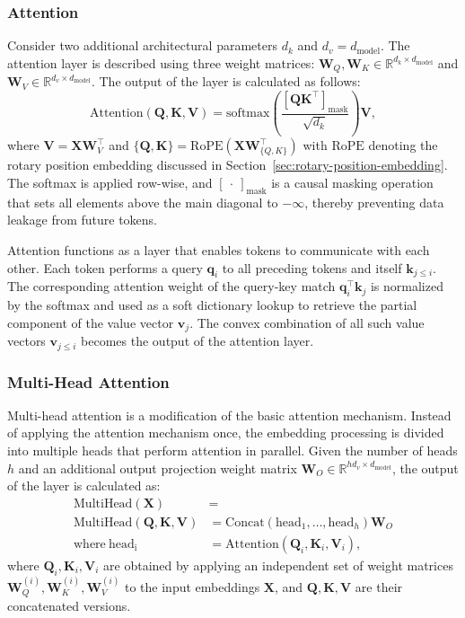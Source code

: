 \subsubsection*{Attention}

Consider two additional architectural parameters \(d_k\) and \(d_v = d_{\mathrm{model}}\). The attention layer is described using three weight matrices: \(\mathbf{W}_Q, \mathbf{W}_K \in \mathbb{R}^{d_k \times d_{\mathrm{model}}}\) and \(\mathbf{W}_V \in \mathbb{R}^{d_v \times d_{\mathrm{model}}}\). The output of the layer is calculated as follows:
\begin{equation}\label{eq:attention}
    \mathrm{Attention}(\mathbf{Q}, \mathbf{K}, \mathbf{V}) = \mathrm{softmax}\left(\frac{\left[\mathbf{QK}^\top\right]_{\mathrm{mask}}}{\sqrt{d_k}}\right)\mathbf{V},
\end{equation}
where \(\mathbf{V} = \mathbf{XW}_V^{\top}\) and \(\{\mathbf{Q}, \mathbf{K}\} = \mathrm{RoPE}(\mathbf{XW}_{\{Q, K\}}^\top)\) with \(\mathrm{RoPE}\) denoting the rotary position embedding discussed in Section~\ref{sec:rotary-position-embedding}. The softmax is applied row-wise, and \([\ \cdot \ ]_{\mathrm{mask}}\) is a causal masking operation that sets all elements above the main diagonal to \(-\infty\), thereby preventing data leakage from future tokens.

Attention functions as a layer that enables tokens to communicate with each other. Each token performs a query \(\mathbf{q}_i\) to all preceding tokens and itself \(\mathbf{k}_{j \le i}\). The corresponding attention weight of the query-key match \(\mathbf{q}_{i}^\top\mathbf{k}_{j}\) is normalized by the softmax and used as a soft dictionary lookup to retrieve the partial component of the value vector \(\mathbf{v}_j\). The convex combination of all such value vectors \(\mathbf{v}_{j \le i}\) becomes the output of the attention layer.

\subsubsection*{Multi-Head Attention}

Multi-head attention is a modification of the basic attention mechanism. Instead of applying the attention mechanism once, the embedding processing is divided into multiple heads that perform attention in parallel. Given the number of heads \(h\) and an additional output projection weight matrix \(\mathbf{W}_O \in \mathbb{R}^{hd_v \times d_{\mathrm{model}}}\), the output of the layer is calculated as:
\begin{align}
    \mathrm{MultiHead}(\mathbf{X}) &= \\ \mathrm{MultiHead}(\mathbf{Q}, \mathbf{K}, \mathbf{V}) &= \mathrm{Concat}(\mathrm{head}_1, \ldots, \mathrm{head}_h) \mathbf{W}_O \\
    \text{where}~\mathrm{head_i} &= \mathrm{Attention}(\mathbf{Q}_i, \mathbf{K}_i, \mathbf{V}_i),
\end{align}
where \(\mathbf{Q}_i, \mathbf{K}_i, \mathbf{V}_i\) are obtained by applying an independent set of weight matrices \(\mathbf{W}_Q^{(i)}, \mathbf{W}_K^{(i)}, \mathbf{W}_V^{(i)}\) to the input embeddings \(\mathbf{X}\), and \(\mathbf{Q}, \mathbf{K}, \mathbf{V}\) are their concatenated versions.


